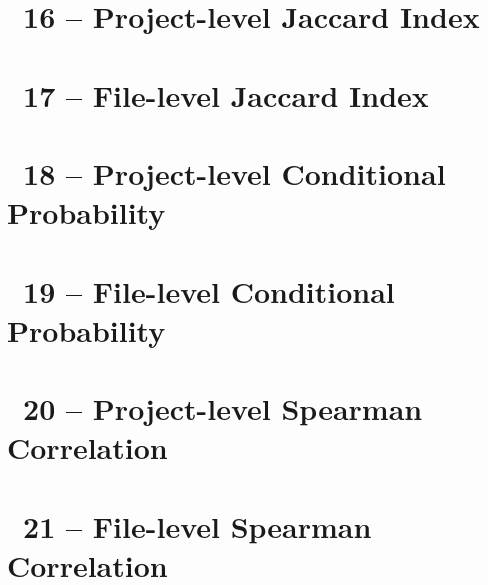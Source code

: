 \chapter*{\appendixTitle~16 -- Project-level Jaccard Index}


\clearpage
{}
\makeatletter
\def\@currentlabel{17}
\makeatother
{}\label{chapter:appendix-jaccard-file}
\chapter*{\appendixTitle~17 -- File-level Jaccard Index}


\clearpage
{}
\makeatletter
\def\@currentlabel{18}
\makeatother
{}\label{chapter:appendix-conditional-project}
\chapter*{\appendixTitle~18 -- Project-level Conditional Probability}


\clearpage
{}
\makeatletter
\def\@currentlabel{19}
\makeatother
{}\label{chapter:appendix-conditional-file}
\chapter*{\appendixTitle~19 -- File-level Conditional Probability}


\clearpage
{}
\makeatletter
\def\@currentlabel{20}
\makeatother
{}\label{chapter:appendix-spearman-project}
\chapter*{\appendixTitle~20 -- Project-level Spearman Correlation}


\clearpage
{}
\makeatletter
\def\@currentlabel{21}
\makeatother
{}\label{chapter:appendix-spearman-file}
\chapter*{\appendixTitle~21 -- File-level Spearman Correlation}

